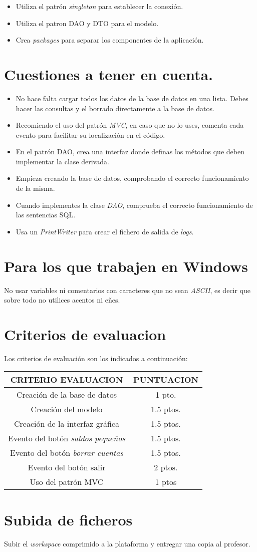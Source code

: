 \documentclass[4paper]{article}
\begin{document}
\begin{itemize}
\item Utiliza el patrón \emph{singleton} para establecer la conexión.
\item Utiliza el patron DAO y DTO para el modelo.
\item Crea \emph{packages} para separar los componentes de la aplicación.
\end{itemize}

\section*{Cuestiones a tener en cuenta.}
\begin{itemize}
\item No hace falta cargar todos los datos de la base de datos en una lista. Debes hacer las consultas y el borrado directamente a la base de datos.
\item Recomiendo el uso del patrón \emph{MVC}, en caso que no lo uses, comenta cada evento para facilitar su localización en el código.
\item En el patrón DAO, crea una interfaz donde definas los métodos que deben implementar la clase derivada. 
\item Empieza creando la base de datos, comprobando el correcto funcionamiento de la misma.
\item Cuando implementes la clase \emph{DAO}, comprueba el correcto funcionamiento de las sentencias SQL.
\item Usa un \emph{PrintWriter} para crear el fichero de salida de \emph{logs}.
\end{itemize}
\section*{Para los que trabajen en Windows}
No usar variables ni comentarios con caracteres que no sean \emph{ASCII}, es decir que sobre todo no utilices acentos ni eñes.

\section*{Criterios de evaluacion}
Los criterios de evaluación son los indicados a continuación:\par 
\vspace*{0.5cm}
\begin{tabular}{|c|c|}
\hline
\textbf{CRITERIO EVALUACION} & \textbf{PUNTUACION} \\
\hline
Creación de la base de datos & 1 pto.\\
\hline
Creación del modelo & 1.5 ptos.\\
\hline
Creación de la interfaz gráfica & 1.5 ptos.\\
\hline
Evento del botón \emph{saldos pequeños}& 1.5 ptos.\\
\hline
Evento del botón \emph{borrar cuentas}& 1.5 ptos.\\
\hline
Evento del botón salir & 2 ptos.\\
\hline
Uso del patrón MVC  & 1 ptos\\
\hline
\end{tabular}
\section*{Subida de ficheros}
Subir el \emph{workspace} comprimido a la plataforma y entregar una copia al profesor.
\end{document}
